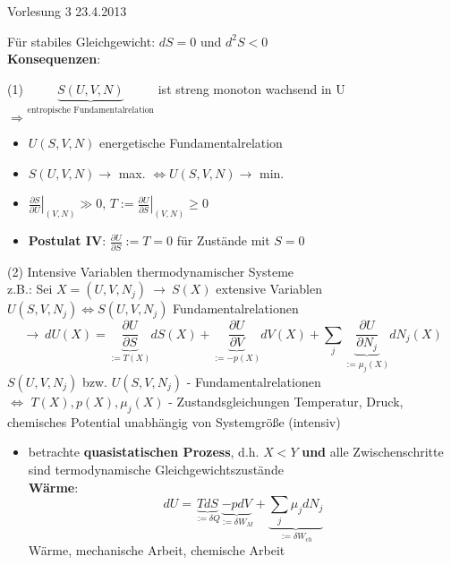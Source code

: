 \documentclass[10pt,article,colorback,accentcolor=tud9d]{scrartcl}
\begin{document}
\begin{flushright}
Vorlesung 3 23.4.2013
\end{flushright}
Für stabiles Gleichgewicht: $dS=0$ und $d^2S<0$\\
\textbf{Konsequenzen}:\\
\begin{fleqn}
(1) $\underbrace{S(U,V,N)}_{\text{entropische Fundamentalrelation}}$ ist streng monoton wachsend in U\\
   $\Rightarrow$
 \begin{itemize}
   \item $U(S,V,N)$ energetische Fundamentalrelation
   \item $S(U,V,N) \rightarrow$ max. $\Leftrightarrow U(S,V,N) \rightarrow$ min. 
   \item $\left.\frac{\partial S}{\partial U}\right|_{(V,N)} \gg 0$, $T:= \left.\frac{\partial U}{\partial S}\right|_{(V,N)} \geq 0$
   \item \textbf{Postulat IV}: $\frac{\partial U}{\partial S} :=T=0$ für Zustände mit $S=0$
 \end{itemize}
 (2) Intensive Variablen thermodynamischer Systeme\\
 z.B.: Sei $X=(U,V,N_j) \ \rightarrow \ S(X)$ extensive Variablen\\
 $U(S,V,N_j) \Leftrightarrow S(U,V,N_j)$ Fundamentalrelationen
 \begin{equation}
   \rightarrow \ dU(X)= \underbrace{\frac{\partial U}{\partial S}}_{:=T(X)} dS(X) + \underbrace{\frac{\partial U}{\partial V}}_{:= -p(X)}dV(X) +\sum_j \underbrace{\frac{\partial U}{\partial N_j}}_{:=\mu_j(X)}dN_j(X)
 \end{equation}
 $S(U,V,N_j)$ bzw. $U(S,V,N_j)$ - Fundamentalrelationen\\
 $\Leftrightarrow$ $T(X),p(X),\mu_j(X)$ - Zustandsgleichungen
 Temperatur, Druck, chemisches Potential unabhängig von Systemgröße (intensiv)
 \begin{itemize}
  \item betrachte \textbf{quasistatischen Prozess}, d.h. $X<Y$ \textbf{und} alle Zwischenschritte sind termodynamische Gleichgewichtszustände\\
   \textbf{Wärme}:
   \begin{equation}
    dU = \underbrace{TdS}_{:=\delta Q} \underbrace{-pdV}_{:=\delta W_M} + \underbrace{\sum_j \mu_j dN_j}_{:=\delta W_{ch}}
   \end{equation}
   Wärme, mechanische Arbeit, chemische Arbeit
 \end{itemize}

\end{fleqn}
\end{document}
